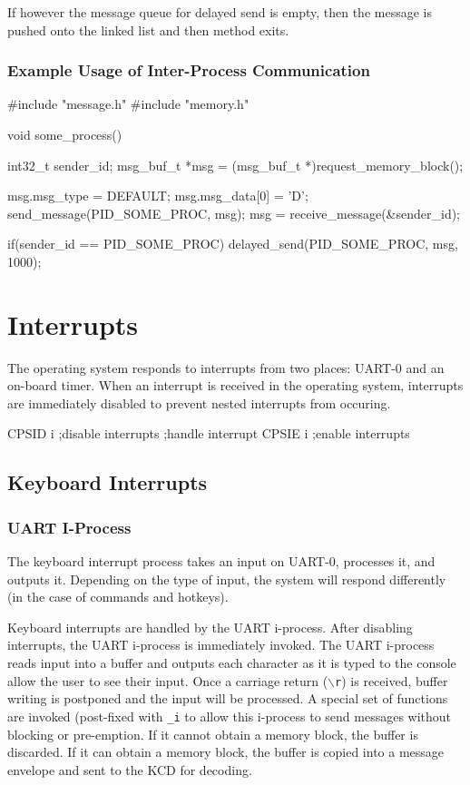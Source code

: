 \documentclass[se]{uw-wkrpt}
\begin{document}
If however the message queue for delayed send is empty, then the message is pushed onto the linked list and then method exits.

\subsubsection{Example Usage of Inter-Process Communication}

\begin{code}
#include "message.h"
#include "memory.h"

void some_process() {
	int32_t sender_id;
	msg_buf_t *msg = (msg_buf_t *)request_memory_block();
	
	msg.msg_type = DEFAULT;
	msg.msg_data[0] = 'D';
	send_message(PID_SOME_PROC, msg);
	msg = receive_message(&sender_id);
	
	if(sender_id == PID_SOME_PROC) {
		delayed_send(PID_SOME_PROC, msg, 1000);
	}
}
\end{code}

\section{Interrupts}\label{sec:interupt}

The operating system responds to interrupts from two places: UART-0 and an on-board timer. When an interrupt is received in the operating system, interrupts are immediately disabled to prevent nested interrupts from occuring. 

\begin{code}
CPSID i                        ;disable interrupts
;handle interrupt
CPSIE i                         ;enable interrupts
\end{code}

\subsection{Keyboard Interrupts} \label{sec:uart}

\subsubsection{UART I-Process}

The keyboard interrupt process takes an input on UART-0, processes it, and outputs it. Depending on the type of input, the system will respond differently (in the case of commands and hotkeys).

Keyboard interrupts are handled by the UART i-process. After disabling interrupts, the UART i-process is immediately invoked. The UART i-process reads input into a buffer and outputs each character as it is typed to the console allow the user to see their input. Once a carriage return (\texttt{$\backslash$r}) is received, buffer writing is postponed and the input will be processed. A special set of functions are invoked (post-fixed with \texttt{\_i} to allow this i-process to send messages without blocking or pre-emption. If it cannot obtain a memory block, the buffer is discarded. If it can obtain a memory block, the buffer is copied into a message envelope and sent to the KCD for decoding. 
\end{document}
